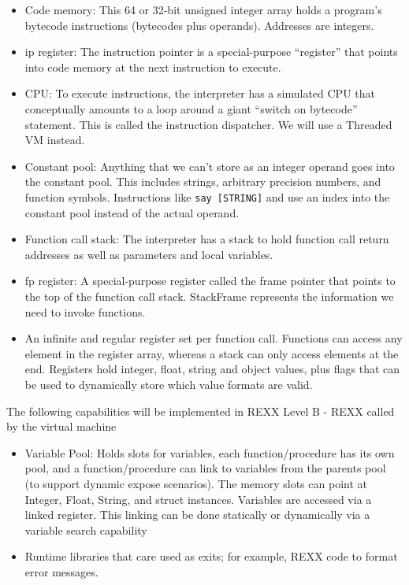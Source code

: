 \begin{itemize}
\item Code memory: This 64 or 32-bit unsigned integer array holds a program's \textquotedbl{}bytecode\textquotedbl{} instructions
(bytecodes plus operands). Addresses are integers.

\item ip register: The instruction pointer is a special-purpose ``register'' that
points into code memory at the next instruction to execute.

\item CPU: To execute instructions, the interpreter has a simulated CPU that
conceptually amounts to a loop around a giant ``switch on bytecode'' statement.
This is called the instruction dispatcher. We will use a Threaded VM instead.

\item Constant pool: Anything that we can't store as an integer operand
goes into the constant pool. This includes strings, arbitrary precision numbers,
and function symbols. Instructions like \texttt{say {[}STRING{]}} and use an index into
the constant pool instead of the actual operand.

\item Function call stack: The interpreter has a stack to hold function call return
addresses as well as parameters and local variables.

\item fp register: A special-purpose register called the frame pointer that points
to the top of the function call stack. StackFrame represents the information
we need to invoke functions.

\item An infinite and regular register set per function call. Functions can access
any element in the register array, whereas a stack can only access elements
at the end. Registers hold integer, float, string and object values, plus flags
that can be used to dynamically store which value formats are valid.

\end{itemize}

The following capabilities will be implemented in REXX Level B - REXX called by the virtual machine

\begin{itemize}
\item Variable Pool: Holds slots for variables, each function/procedure has its own
pool, and a function/procedure can \textquotedbl{}link\textquotedbl{} to variables from the parents pool (to
support dynamic expose scenarios).
The memory slots can point at Integer, Float, String, and struct instances.
Variables are accessed via a linked register. This linking can be done statically
or dynamically via a variable search capability

\item Runtime libraries that care used as \textquotedbl{}exits\textquotedbl{}; for example, REXX code to format error messages.

\end{itemize}

